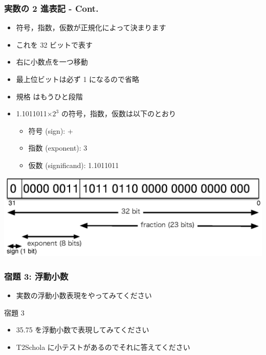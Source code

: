 \begin{frame}[shrink]
\frametitle{実数の 2 進表記 - Cont.}
  \begin{itemize}
\item 符号，指数，仮数が正規化によって決まります
\item これを 32 ビットで表す
\item 右に小数点を一つ移動
\item 最上位ビットは必ず 1 になるので省略
\item 規格 \href{http://ieeexplore.ieee.org/xpl/mostRecentIssue.jsp?punumber=2355}{} はもうひと段階
  \end{itemize}
  \begin{center}
    \begin{example}
      \begin{itemize}
\item 1.1011011\(\times 2^3\) の符号，指数，仮数は以下のとおり
        \begin{itemize}
\item 符号 (sign): +
\item 指数 (exponent): 3
\item 仮数 (significand): 1.1011011
        \end{itemize}
      \end{itemize}
    \end{example}
\includegraphics[scale=.4]{./Figure/elementaryCS-figFloatingPointFormat.eps}
  \end{center}
\end{frame}
\begin{frame}
\frametitle{宿題 3: 浮動小数}
  \begin{itemize}
\item 実数の浮動小数表現をやってみてください
  \end{itemize}
  \begin{block}{宿題 3}
    \begin{itemize}
\item 35.75 を浮動小数で表現してみてください
\item T2Schola に小テストがあるのでそれに答えてください
    \end{itemize}
  \end{block}
\end{frame}
